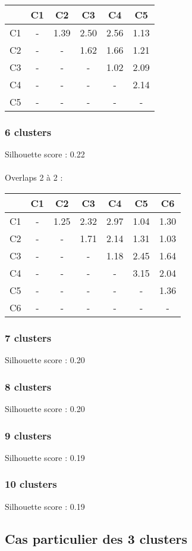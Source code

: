 \documentclass{article}
\begin{document}
\begin{tabular}{|c|c|c|c|c|c|}
\hline
& C1 & C2 & C3 & C4 & C5 \\
\hline
C1 & - & 1.39 & 2.50 & 2.56 & 1.13 \\
\hline
C2 & - & - & 1.62 & 1.66 & 1.21 \\
\hline
C3 & - & - & - & 1.02 &2.09 \\
\hline
C4 & - & - & - & - & 2.14 \\
\hline
C5 & - & - & - & - & - \\
\hline
\end{tabular}

\subsubsection*{6 clusters}

Silhouette score : 0.22 \\\\
Overlaps 2 à 2 :\\

\begin{tabular}{|c|c|c|c|c|c|c|}
\hline
& C1 & C2 & C3 & C4 & C5 & C6 \\
\hline
C1 & - & 1.25 & 2.32 & 2.97 & 1.04 & 1.30 \\
\hline
C2 & - & - & 1.71 & 2.14 & 1.31 & 1.03 \\
\hline
C3 & - & - & - & 1.18 & 2.45 & 1.64 \\
\hline
C4 & - & - & - & - & 3.15 & 2.04 \\
\hline
C5 & - & - & - & - & - & 1.36 \\
\hline
C6 & - & - & - & - & - & - \\
\hline
\end{tabular}

\subsubsection*{7 clusters}

Silhouette score : 0.20

\subsubsection*{8 clusters}

Silhouette score : 0.20

\subsubsection*{9 clusters}

Silhouette score : 0.19

\subsubsection*{10 clusters}

Silhouette score : 0.19

\subsection*{Cas particulier des 3 clusters}
\end{document}
